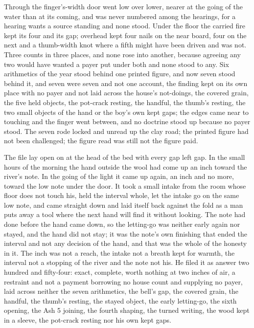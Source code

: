 Through the finger's-width door  went low over lower, nearer at the going of the water than at its coming, and was never numbered among the hearings, for a hearing wants a source standing and none stood. Under the floor the carried fire kept its four and its gap; overhead  kept four nails on the near board, four on the next and a thumb-width knot where a fifth might have been driven and was not. Three counts in three places, and none rose into another, because agreeing any two would have wanted a payer put under both and none stood to any. Six arithmetics of the year stood behind one printed figure, and now seven stood behind it, and seven were seven and not one account, the finding kept on its own place with no payer and not laid across the house's not-doings, the covered grain, the five held objects, the pot-crack resting, the handful, the thumb's resting, the two small objects of the hand or the boy's own kept gaps; the edges came near to touching and the finger went between, and no doctrine stood up because no payer stood. The seven rode locked and unread up the clay road; the printed figure had not been challenged; the figure read was still not the figure paid.

The file lay open on  at the head of the bed with every gap left gap. In the small hours of the morning the hand outside the wool had come up an inch toward the river's note. In the going of the light it came up again, an inch and no more, toward the low note under the door. It took a small intake from the room whose floor does not touch his, held the interval whole, let the intake go on the same low note, and came straight down and laid itself back against the fold as a man puts away a tool where the next hand will find it without looking. The note had done before the hand came down, so the letting-go was neither early again nor stayed, and the hand did not stay; it was the note's own finishing that ended the interval and not any decision of the hand, and that was the whole of the honesty in it. The inch was not a reach, the intake not a breath kept for warmth, the interval not a stopping of the river and the note not his. He filed it as answer two hundred and fifty-four: exact, complete, worth nothing at two inches of air, a restraint and not a payment borrowing no house count and supplying no payer, laid across neither the seven arithmetics, the bell's gap, the covered grain, the handful, the thumb's resting, the stayed object, the early letting-go, the sixth opening, the Ash 5 joining, the fourth shaping, the turned writing, the wood kept in a sleeve, the pot-crack resting nor his own kept gaps.

